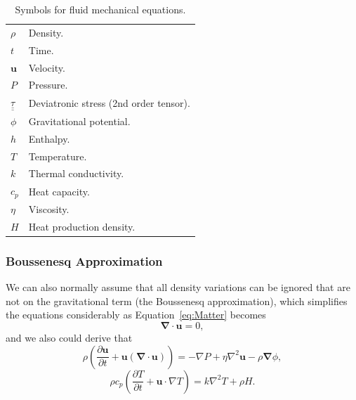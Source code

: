\begin{table}[h!]
    \centering
    \begin{tabular}{ll}
        $\rho$ & Density. \\
        $t$ & Time. \\
        $\mathbf{u}$ & Velocity. \\
        $P$ & Pressure. \\
        $\underline{\underline{\tau}}$ & Deviatronic stress (2nd order tensor). \\
        $\phi$ & Gravitational potential. \\
         $h$ & Enthalpy.\\
         $T$ & Temperature. \\
         $k$ & Thermal conductivity.\\
         $c_p$ & Heat capacity.\\
         $\eta$ & Viscosity. \\
         $H$ & Heat production density.\\
    \end{tabular}
    \caption{Symbols for fluid mechanical equations.}
    \label{tab:fluid_variables}
\end{table}

\subsubsection{Boussenesq Approximation}
We can also normally assume that all density variations can be ignored that
 are not on the gravitational term (the Boussenesq approximation),
  which simplifies the equations considerably as Equation~\ref{eq:Matter} becomes
\begin{equation}
    \boldsymbol{\nabla}\cdot\mathbf{u} = 0, \tag{B-Matter}
\end{equation}
and we also could derive that
\begin{equation}
\rho\left (\frac{\partial \mathbf{u}}{\partial t}
+ \mathbf{u}(\boldsymbol{\nabla}\cdot \mathbf{u})\right)=
-\nabla P+\eta \nabla^{2} \mathbf{u}-\rho \boldsymbol{\nabla}\phi, \tag{B-Momentum}
\end{equation}
\begin{equation}
\rho c_{p}\left(\frac{\partial T}{\partial t}
+\mathbf{u} \cdot \nabla T\right)=k \nabla^{2} T+\rho H. \tag{B-Energy}
\end{equation}

